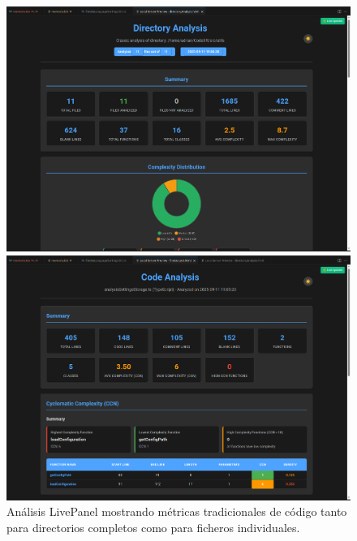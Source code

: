 \documentclass[a4paper, 12pt]{book}
\begin{document}
\begin{figure}[H]
\centering
\begin{minipage}[b]{0.48\textwidth}
\centering
\includegraphics[width=\textwidth]{img/livepanel-directorio-analisis.png}
\end{minipage}
\hfill
\begin{minipage}[b]{0.48\textwidth}
\centering
\includegraphics[width=\textwidth]{img/livepanel-fichero-analisis.png}
\end{minipage}
\caption{Análisis LivePanel mostrando métricas tradicionales de código tanto para directorios completos como para ficheros individuales.}
\label{fig:livepanel-analisis}
\end{figure}
\end{document}
